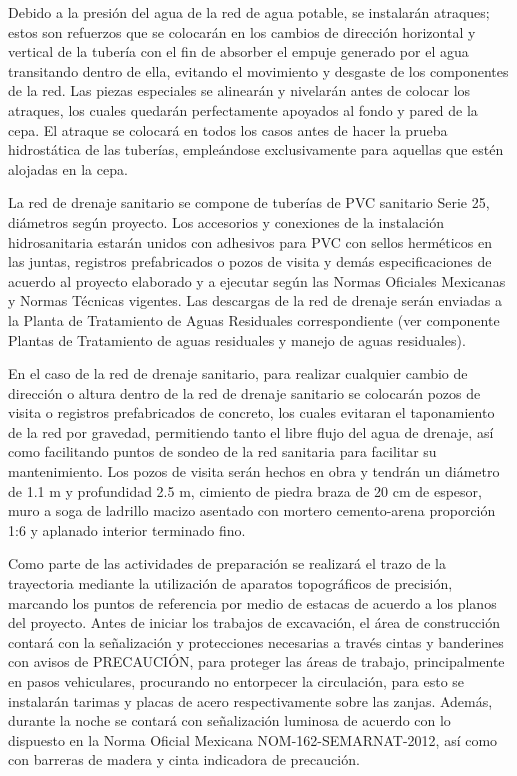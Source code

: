 \documentclass{article}
\begin{document}
\bigskip

Debido a la presión del agua de la red de agua potable, se instalarán atraques; estos son refuerzos que se colocarán en los cambios de dirección horizontal y vertical de la tubería con el fin de absorber el empuje generado por el agua transitando dentro de ella, evitando el movimiento y desgaste de los componentes de la red. Las piezas especiales se alinearán y nivelarán antes de colocar los atraques, los cuales quedarán perfectamente apoyados al fondo y pared de la cepa. El atraque se colocará en todos los casos antes de hacer la prueba hidrostática de las tuberías, empleándose exclusivamente para aquellas que estén alojadas en la cepa. 


\bigskip

La red de drenaje sanitario se compone de tuberías de PVC sanitario Serie 25, diámetros según proyecto. Los accesorios y conexiones de la instalación hidrosanitaria estarán unidos con adhesivos para PVC con sellos herméticos en las juntas, registros prefabricados o pozos de visita y demás especificaciones de acuerdo al proyecto elaborado y a ejecutar según las Normas Oficiales Mexicanas y Normas Técnicas vigentes. Las descargas de la red de drenaje serán enviadas a la Planta de Tratamiento de Aguas Residuales correspondiente (ver componente Plantas de Tratamiento de aguas residuales y manejo de aguas residuales).


\bigskip

En el caso de la red de drenaje sanitario, para realizar cualquier cambio de dirección o altura dentro de la red de drenaje sanitario se colocarán pozos de visita o registros prefabricados de concreto, los cuales evitaran el taponamiento de la red por gravedad, permitiendo tanto el libre flujo del agua de drenaje, así como facilitando puntos de sondeo de la red sanitaria para facilitar su mantenimiento. Los pozos de visita serán hechos en obra y tendrán un diámetro de 1.1 m y profundidad 2.5 m, cimiento de piedra braza de 20 cm de espesor, muro a soga de ladrillo macizo asentado con mortero cemento-arena proporción 1:6 y aplanado interior terminado fino.


\bigskip

Como parte de las actividades de preparación se realizará el trazo de la trayectoria mediante la utilización de aparatos topográficos de precisión, marcando los puntos de referencia por medio de estacas de acuerdo a los planos del proyecto. Antes de iniciar los trabajos de excavación, el área de construcción contará con la señalización y protecciones necesarias a través cintas y banderines con avisos de PRECAUCIÓN, para proteger las áreas de trabajo, principalmente en pasos vehiculares, procurando no entorpecer la circulación, para esto se instalarán tarimas y placas de acero respectivamente sobre las zanjas. Además, durante la noche se contará con señalización luminosa de acuerdo con lo dispuesto en la Norma Oficial Mexicana NOM-162-SEMARNAT-2012, así como con barreras de madera y cinta indicadora de precaución.
\end{document}

